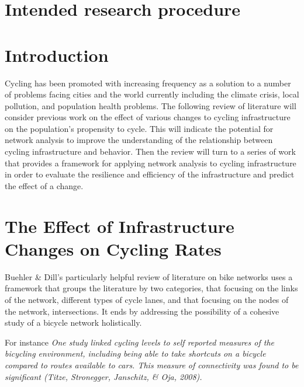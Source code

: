 \documentclass[11pt]{article} %
\begin{document}
\section{Intended research procedure}

\section{}

\section{}




\section{Introduction}

	Cycling has been promoted with increasing frequency as a solution to a number of problems facing cities and the world currently including the climate crisis, local pollution, and population health problems. The following review of literature will consider previous work on the effect of various changes to cycling infrastructure on the population's propensity to cycle. This will indicate the potential for network analysis to improve the understanding of the relationship between cycling infrastructure and behavior. Then the review will turn to a series of work that provides a framework for applying network analysis to cycling infrastructure in order to evaluate the resilience and efficiency of the infrastructure and predict the effect of a change. 
	
\section{The Effect of Infrastructure Changes on Cycling Rates}

	Buehler \& Dill's \cite{Buehler and Dill} particularly helpful review of literature on bike networks uses a framework that groups the literature by two categories, that focusing on the links of the network, different types of cycle lanes, and that focusing on the nodes of the network, intersections. It ends by addressing the possibility of a cohesive study of a bicycle network holistically. 
	
	For instance \textit{One study linked cycling levels to self reported measures of the bicycling environment, including being able to take shortcuts on a bicycle compared to routes available to cars. This measure of connectivity was found to be significant (Titze, Stronegger, Janschitz, \& Oja, 2008).}
	
\end{document}
